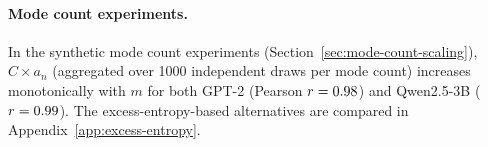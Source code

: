 \paragraph{Mode count experiments.} In the synthetic mode count experiments (Section~\ref{sec:mode-count-scaling}), $C \times a_n$ (aggregated over 1000 independent draws per mode count) increases monotonically with $m$ for both GPT-2 (Pearson $r = 0.98{}$) and Qwen2.5-3B ($r = 0.99{}$).
The excess-entropy-based alternatives are compared in Appendix~\ref{app:excess-entropy}.

